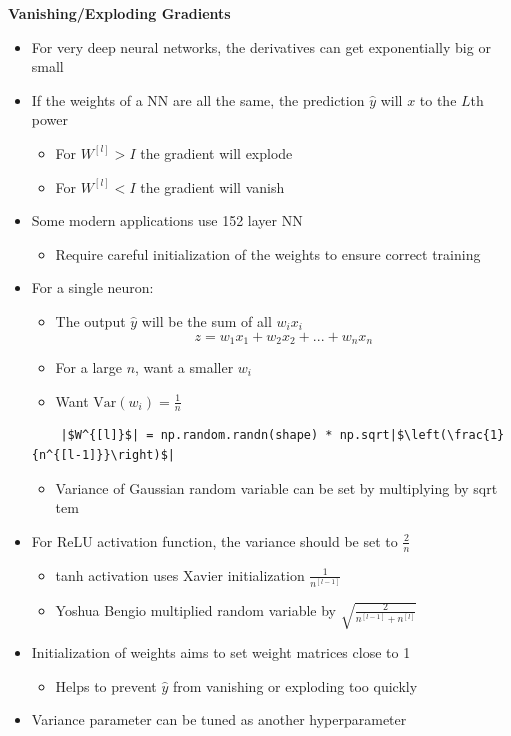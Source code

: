 \documentclass[12pt, letterpaper]{article}
\begin{document}
    \vspace{5mm}
    \textbf{Vanishing/Exploding Gradients}
    \begin{itemize}
        \item For very deep neural networks, the derivatives can get exponentially big or small
        \item If the weights of a NN are all the same, the prediction $\hat{y}$ will $x$ to the $L$th power
        \begin{itemize}
            \item For $W^{[l]}>I$ the gradient will explode
            \item For $W^{[l]}<I$ the gradient will vanish
        \end{itemize}
        \item Some modern applications use 152 layer NN
        \begin{itemize}
            \item Require careful initialization of the weights to ensure correct training
        \end{itemize}
        \item For a single neuron:
        \begin{itemize}
            \item The output $\hat{y}$ will be the sum of all $w_ix_i$
            $$z = w_1x_1+w_2x_2+...+w_nx_n$$
            \item For a large $n$, want a smaller $w_i$
            \item Want $\text{Var}(w_i)=\frac{1}{n}$
        \end{itemize}
        \begin{verbatim}
    |$W^{[l]}$| = np.random.randn(shape) * np.sqrt|$\left(\frac{1}{n^{[l-1]}}\right)$|
        \end{verbatim}
        \begin{itemize}
            \item Variance of Gaussian random variable can be set by multiplying by sqrt tem
        \end{itemize}
        \item For ReLU activation function, the variance should be set to $\frac{2}{n}$
        \begin{itemize}
            \item tanh activation uses Xavier initialization $\frac{1}{n^{[l-1]}}$
            \item Yoshua Bengio multiplied random variable by $\sqrt{\frac{2}{n^{[l-1]}+n^{[l]}}}$
        \end{itemize}
        \item Initialization of weights aims to set weight matrices close to 1
        \begin{itemize}
            \item Helps to prevent $\hat{y}$ from vanishing or exploding too quickly
        \end{itemize}
        \item Variance parameter can be tuned as another hyperparameter
    \end{itemize}
\end{document}
